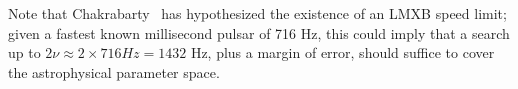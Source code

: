 Note that Chakrabarty~\cite{Chakrabarty2003} has hypothesized the existence of an LMXB speed limit; given a fastest known millisecond pulsar of 716 Hz, this could imply that a search up to $2\nu \approx 2\times716 Hz = 1432$ Hz, plus a margin of error, should suffice to cover the astrophysical parameter space. 








